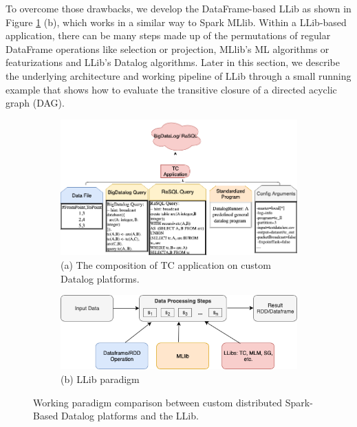 To overcome those drawbacks, we develop the DataFrame-based LLib as shown in Figure \ref{fig:comparison} (b), which works in a similar way to Spark MLlib. Within a LLib-based application, there can be many steps made up of the permutations of regular DataFrame operations like selection or projection,  MLlib's ML algorithms or featurizations and LLib's Datalog algorithms. Later in this section, we describe the underlying architecture and working pipeline of LLib through a small running example that shows how to evaluate the transitive closure of a directed acyclic graph (DAG). 

\begin{figure}[!t]
	\centering
	\begin{subfigure}{0.7\textwidth}
		\centering
		\includegraphics[width=1\linewidth]{Graph/llib/datalogPipeline.png}
		\caption{\small (a) The composition of TC application on custom Datalog platforms. } 
	\end{subfigure}%
	\vspace{\floatsep}
	
	
	\begin{subfigure}{0.6\textwidth}
		\centering
		\includegraphics[width=1\linewidth]{Graph/llib/DatalogLib-4.png}
		\caption{\small(b) LLib paradigm} 
	\end{subfigure}%
	\caption{Working paradigm comparison between custom distributed Spark-Based Datalog platforms and the LLib.}\label{fig:comparison}
\end{figure}


